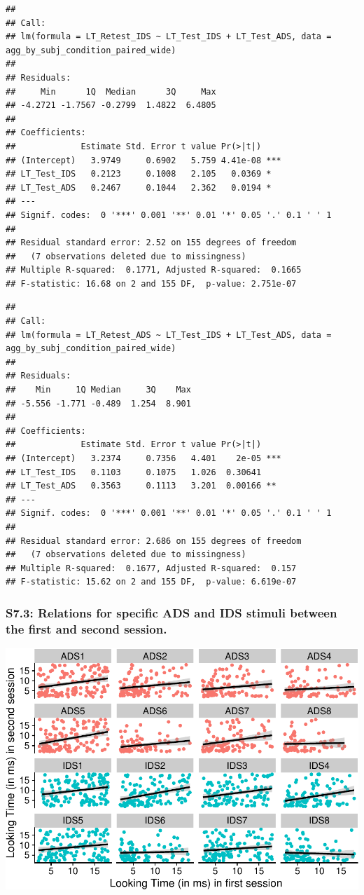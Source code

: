 \documentclass[
  man, donotrepeattitle,floatsintext]{apa6}
\begin{document}
\begin{verbatim}
## 
## Call:
## lm(formula = LT_Retest_IDS ~ LT_Test_IDS + LT_Test_ADS, data = agg_by_subj_condition_paired_wide)
## 
## Residuals:
##     Min      1Q  Median      3Q     Max 
## -4.2721 -1.7567 -0.2799  1.4822  6.4805 
## 
## Coefficients:
##             Estimate Std. Error t value Pr(>|t|)    
## (Intercept)   3.9749     0.6902   5.759 4.41e-08 ***
## LT_Test_IDS   0.2123     0.1008   2.105   0.0369 *  
## LT_Test_ADS   0.2467     0.1044   2.362   0.0194 *  
## ---
## Signif. codes:  0 '***' 0.001 '**' 0.01 '*' 0.05 '.' 0.1 ' ' 1
## 
## Residual standard error: 2.52 on 155 degrees of freedom
##   (7 observations deleted due to missingness)
## Multiple R-squared:  0.1771, Adjusted R-squared:  0.1665 
## F-statistic: 16.68 on 2 and 155 DF,  p-value: 2.751e-07
\end{verbatim}

\begin{verbatim}
## 
## Call:
## lm(formula = LT_Retest_ADS ~ LT_Test_IDS + LT_Test_ADS, data = agg_by_subj_condition_paired_wide)
## 
## Residuals:
##    Min     1Q Median     3Q    Max 
## -5.556 -1.771 -0.489  1.254  8.901 
## 
## Coefficients:
##             Estimate Std. Error t value Pr(>|t|)    
## (Intercept)   3.2374     0.7356   4.401    2e-05 ***
## LT_Test_IDS   0.1103     0.1075   1.026  0.30641    
## LT_Test_ADS   0.3563     0.1113   3.201  0.00166 ** 
## ---
## Signif. codes:  0 '***' 0.001 '**' 0.01 '*' 0.05 '.' 0.1 ' ' 1
## 
## Residual standard error: 2.686 on 155 degrees of freedom
##   (7 observations deleted due to missingness)
## Multiple R-squared:  0.1677, Adjusted R-squared:  0.157 
## F-statistic: 15.62 on 2 and 155 DF,  p-value: 6.619e-07
\end{verbatim}

\hypertarget{s7.3-relations-for-specific-ads-and-ids-stimuli-between-the-first-and-second-session.}{%
\subsubsection{S7.3: Relations for specific ADS and IDS stimuli between the first and second session.}\label{s7.3-relations-for-specific-ads-and-ids-stimuli-between-the-first-and-second-session.}}

\includegraphics{MB1T_supplement_files/figure-latex/unnamed-chunk-12-1.pdf}
\end{document}
